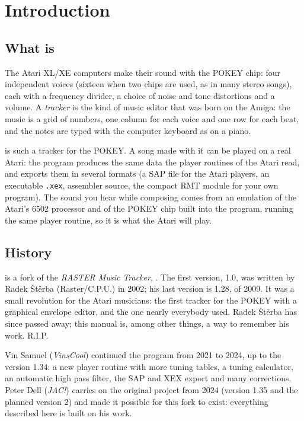 \chapter{Introduction}\label{ch:intro}

\section{What \RITMO{} is}

The Atari XL/XE computers make their sound with the POKEY chip: four independent voices
(sixteen when two chips are used, as in many stereo songs), each with a frequency divider, a
choice of noise and tone distortions and a volume. A \emph{tracker} is the kind of music editor
that was born on the Amiga: the music is a grid of numbers, one column for each voice and one
row for each beat, and the notes are typed with the computer keyboard as on a piano.

\RITMO{} is such a tracker for the POKEY. A song made with it can be played on a real Atari: the
program produces the same data the player routines of the Atari read, and exports them in
several formats (a SAP file for the Atari players, an executable \texttt{.xex}, assembler source,
the compact RMT module for your own program). The sound you hear while composing comes from an
emulation of the Atari's 6502 processor and of the POKEY chip built into the program, running
the same player routine, so it is what the Atari will play.


\section{History}

\RITMO{} is a fork of the \emph{RASTER Music Tracker}, \RMT{}. The first version, 1.0, was
written by Radek \v{S}t\v{e}rba (Raster/C.P.U.) in 2002; his last version is 1.28, of 2009. It was
a small revolution for the Atari musicians: the first tracker for the POKEY with a
graphical envelope editor, and the one nearly everybody used. Radek \v{S}t\v{e}rba has since
passed away; this manual is, among other things, a way to remember his work. R.I.P.

Vin Samuel (\emph{VinsCool}) continued the program from 2021 to 2024, up to the version 1.34: a
new player routine with more tuning tables, a tuning calculator, an automatic high pass filter,
the SAP and XEX export and many corrections. Peter Dell (\emph{JAC!}) carries on the original
project from 2024 (version 1.35 and the planned version 2) and made it possible for this fork
to exist: everything described here is built on his work.

